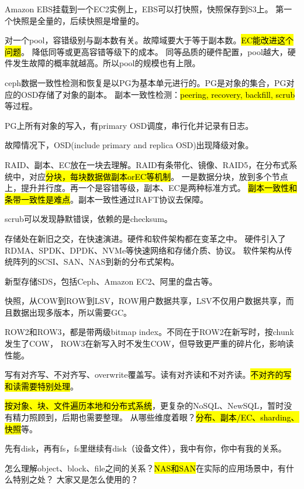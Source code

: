 \hrulefill

Amazon EBS挂载到一个EC2实例上，EBS可以打快照，快照保存到S3上。
第一个快照是全量的，后续快照是增量的。

对一个pool，容错级别与副本数有关。故障域要大于等于副本数。\hl{EC能改进这个问题}。
降低同等或更高容错等级下的成本。
同等品质的硬件配置，pool越大，硬件发生故障的概率就越高。所以pool的规模也有上限。

ceph数据一致性检测和恢复是以PG为基本单元进行的。PG是对象的集合，PG对应的OSD存储了对象的副本。
副本一致性检测：\hl{peering, recovery, backfill, scrub}等过程。

PG上所有对象的写入，有primary OSD调度，串行化并记录有日志。

故障情况下，OSD(include primary and replica OSD)出现降级对象。

\hrulefill

RAID、副本、EC放在一块去理解。RAID有条带化、镜像、RAID5，在分布式系统中，对应\hl{分块，每块数据做副本orEC等机制}。
一是数据分块，放到多个节点上，提升并行度。再一个是容错等级，副本、EC是两种标准方式。
\hl{副本一致性和条带一致性是难点}。副本一致性通过RAFT协议去保障。

scrub可以发现静默错误，依赖的是checksum。

存储处在新旧之交，在快速演进。硬件和软件架构都在变革之中。
硬件引入了RDMA、SPDK、DPDK、NVMe等快速网络和存储介质、协议。
软件架构从传统阵列的SCSI、SAN、NAS到新的分布式架构。

新型存储SDS，包括Ceph、Amazon EC2、阿里的盘古等。

\hrulefill

快照，从COW到ROW到LSV，ROW用户数据共享，LSV不仅用户数据共享，而且数据出现多版本，所以需要GC。

ROW2和ROW3，都是带两级bitmap index。不同在于ROW2在新写时，按chunk发生了COW，
ROW3在新写入时不发生COW，但导致更严重的碎片化，影响读性能。

写有对齐写、不对齐写、overwrite覆盖写。读有对齐读和不对齐读。\hl{不对齐的写和读需要特别处理}。

\hrulefill

\hl{按对象、块、文件遍历本地和分布式系统}，更复杂的NoSQL、NewSQL，暂时没有精力照顾到，后期也需要整理。
从哪些维度着眼？\hl{分布、副本/EC、sharding、快照}等。

先有disk，再有fs，fs里继续有disk（设备文件），我中有你，你中有我的关系。

怎么理解object、block、file之间的关系？\hl{NAS和SAN}在实际的应用场景中，有什么特别之处？
大家又是怎么使用的？

